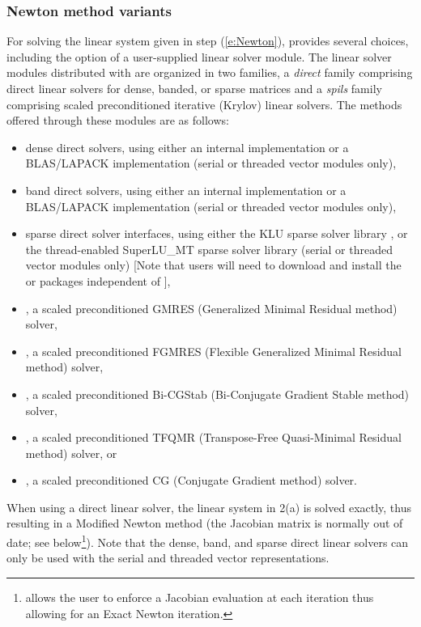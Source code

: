 
\subsubsection*{Newton method variants}
For solving the linear system given in step (\ref{e:Newton}), {\kinsol} provides
several choices, including the option of a user-supplied
linear solver module. The linear solver modules distributed with {\sundials}
are organized in two families, a {\em direct} family comprising direct linear
solvers for dense, banded, or sparse matrices and a {\em spils}
family comprising scaled preconditioned
iterative (Krylov) linear solvers.
The methods offered through these modules are as follows:
\begin{itemize}
\item dense direct solvers, using either an internal implementation or
  a BLAS/LAPACK implementation (serial or threaded vector modules only),
\item band direct solvers, using either an internal implementation or
  a BLAS/LAPACK implementation (serial or threaded vector modules only),
\item sparse direct solver interfaces, using either the KLU sparse solver
  library \cite{DaPa:10,KLU_site}, or the thread-enabled SuperLU\_MT sparse
  solver library \cite{Li:05,DGL:99,SuperLUMT_site} (serial or threaded
  vector modules only) [Note that users will need to download and install the
  {\klu} or {\superlumt} packages independent of {\kinsol}],
\item {\spgmr}, a scaled preconditioned GMRES (Generalized Minimal Residual method)
  solver,
\item {\spfgmr}, a scaled preconditioned FGMRES (Flexible Generalized
  Minimal Residual method) solver,
\item {\spbcg}, a scaled preconditioned Bi-CGStab (Bi-Conjugate Gradient Stable
  method) solver,
\item {\sptfqmr}, a scaled preconditioned TFQMR (Transpose-Free Quasi-Minimal
  Residual method) solver, or
\item {\pcg}, a scaled preconditioned CG (Conjugate Gradient method) solver.
\end{itemize}
When using a direct linear solver, the linear system in 2(a) is
solved exactly, thus resulting in a Modified Newton method (the Jacobian matrix
is normally out of date; see below\footnote{{\kinsol} allows the user to enforce
a Jacobian evaluation at each iteration thus allowing for an Exact Newton iteration.}).
Note that the dense, band, and sparse direct linear solvers can only
be used with the serial and threaded vector representations.

